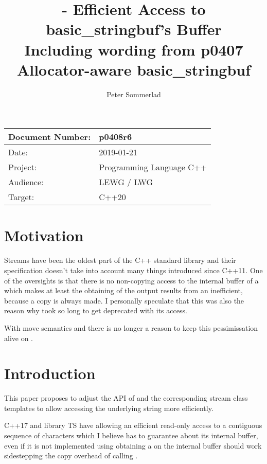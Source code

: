 \documentclass[ebook,11pt,article]{memoir}
\title{\papernumber{} - Efficient Access to basic\_stringbuf's Buffer\\
Including wording from p0407 Allocator-aware basic\_stringbuf}
\author{Peter Sommerlad}
\date{\paperdate}                        %
\newcommand{\papernumber}{p0408r6}
\newcommand{\paperdate}{2019-01-21}
\begin{document}
\maketitle
\begin{tabular}[t]{|l|l|}\hline 
Document Number: & \papernumber  \\\hline
Date: & \paperdate \\\hline
Project: & Programming Language C++\\\hline 
Audience: & LEWG / LWG\\\hline
Target: & C++20\\\hline
\end{tabular}

\chapter{Motivation}
Streams have been the oldest part of the C++ standard library and their specification doesn't take into account many things introduced since C++11. One of  the oversights is that there is no non-copying access to the internal buffer of a  which makes at least the obtaining of the output results from an  inefficient, because a copy is always made. I personally speculate that this was also the reason why  took so long to get deprecated with its  access.

With move semantics and  there is no longer a reason to keep this pessimissation alive on .


\chapter{Introduction}
This paper proposes to adjust the API of  and the corresponding stream class templates to allow accessing the underlying string more efficiently.

C++17 and library TS have  allowing an efficient read-only access to a contiguous sequence of characters which I believe  has to guarantee about its internal buffer, even if it is not implemented using  obtaining a  on the internal buffer should work sidestepping the copy overhead of calling . 
\end{document}
